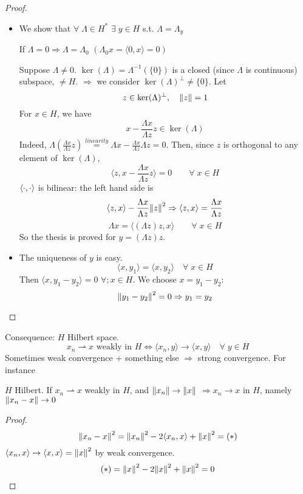 \begin{proof}
    \begin{itemize}
        \item We show that \(\forall\; \Lambda \in H^* \) \(\exists\; y \in H\) s.t. \(\Lambda = \Lambda_y\)
        
        If \(\Lambda = 0 \Rightarrow \Lambda = \Lambda_0\) \((\Lambda_0 x = \langle 0, x\rangle   = 0)\)

        Suppose \(\Lambda \neq 0. \) \(\ker(\Lambda) = \Lambda^{-1}(\{0\}) \) is a closed (since \(\Lambda\) is continuous) subspace, \(\neq H\). \(\Rightarrow\) we consider \(\ker(\Lambda)^\perp \neq \{0\}\). Let
        \[
            z \in \ker(\Lambda)^\perp, \quad \norm{z}=1
        \]
        For \(x \in H\), we have
        \[
            x - \frac{\Lambda x}{\Lambda z} z \in \ker(\Lambda)
        \]
        Indeed, \(\Lambda \left( \frac{\Lambda x}{\Lambda z} z \right) \overset{linearity}{=} \Lambda x - \frac{\Lambda x}{\Lambda z} \Lambda z = 0\). Then, since \(z\) is orthogonal to any element of \(\ker(\Lambda)\), 
        \[
            \langle z, x - \frac{\Lambda x}{\Lambda z} z\rangle   = 0 \qquad \forall\; x \in H
        \] 
        \(\langle \cdot,\cdot \rangle  \) is bilinear: the left hand side is 
        \[
            \langle z, x\rangle   - \frac{\Lambda x}{\Lambda z} \norm{z}^2 \Rightarrow \langle z, x\rangle   = \frac{\Lambda x}{\Lambda z} 
        \]
        \[
            \Lambda x = \langle (\Lambda z)z, x\rangle   \qquad \forall \; x \in H
        \]
        So the thesis is proved for \(y = (\Lambda z)z\).

        \item The uniqueness of \(y\) is easy.
        \[
            \langle x, y_1\rangle   = \langle x, y_2\rangle   \quad \forall \; x \in H
        \]
        Then \(\langle x, y_1-y_2\rangle   = 0\) \(\forall; x \in H\). We choose \(x = y_1 -y_2\):
        \[
            \norm{y_1 - y_2}^2 = 0 \Rightarrow y_1 = y_2
        \]
    \end{itemize}
\end{proof}

Consequence: \(H\) Hilbert space.
\[
    x_n \rightharpoonup x \text{ weakly in } H \iff \langle x_n, y\rangle   \to \langle x, y\rangle   \quad \forall\; y \in H
\]
Sometimes weak convergence + something else \(\Rightarrow\) strong convergence. For instance
\begin{proposition}
    \(H\) Hilbert. If \(x_n \rightharpoonup x\) weakly in \(H\), and \(\norm{x_n} \to \norm{x}\) \(\Rightarrow x_n \to x\) in \(H\), namely \(\norm{x_n - x} \to 0\)
\end{proposition}
\begin{proof}
    \[
        \norm{x_n - x }^2 = \norm{x_n}^2 - 2 \langle x_n, x\rangle   + \norm{x}^2 = (*)
    \]
    \(\langle x_n, x\rangle   \to \langle x, x\rangle   = \norm{x}^2 \) by weak convergence.
    \[
        (*) = \norm{x}^2 - 2 \norm{x}^2 + \norm{x}^2 = 0
    \]
\end{proof}

